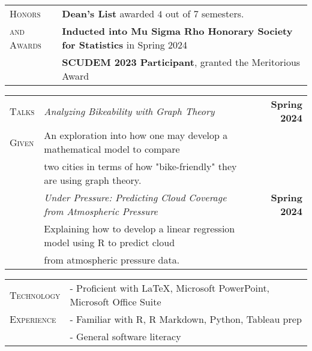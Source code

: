 \documentclass{article}
\begin{document}
\vspace{2.5mm}

\begin{tabular}{l l}
\textsc{Honors} & \textbf{Dean's List} awarded $4$ out of $7$ semesters.\\

\textsc{and Awards}	& \textbf{Inducted into Mu Sigma Rho Honorary Society for Statistics} in Spring 2024 \\
					
					& \textbf{SCUDEM 2023 Participant}, granted the Meritorious Award \\
\end{tabular}

\begin{tabular}{l l r}
\textsc{Talks} & \hspace{5mm}\textit{Analyzing Bikeability with Graph Theory} & \textbf{Spring 2024}\\
\textsc{Given} & \hspace{15mm} An exploration into how one may develop a mathematical model to compare & \\
			  & \hspace{10mm} two cities in terms of how "bike-friendly" they are using graph theory. & \\
			  
			  & \hspace{5mm}\textit{Under Pressure: Predicting Cloud Coverage from Atmospheric Pressure} & \textbf{Spring 2024}\\
			  &\hspace{15mm} Explaining how to develop a linear regression model using R to predict cloud & \\
			  & \hspace{10mm}from atmospheric pressure data.
\end{tabular}

\hspace{2.5mm}

\begin{tabular}{l l}
\textsc{Technology} & - Proficient with \LaTeX , Microsoft PowerPoint, Microsoft Office Suite\\
\textsc{Experience} & - Familiar with R, R Markdown, Python, Tableau prep\\
				    & - General software literacy
\end{tabular}
\end{document}
